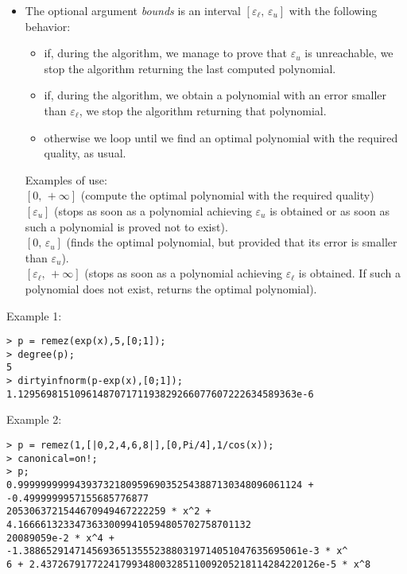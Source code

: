\begin{itemize}
\item The optional argument \emph{bounds} is an interval $[\varepsilon_\ell,\,\varepsilon_u]$
   with the following behavior:\begin{itemize}
     \item if, during the algorithm, we manage to prove that $\varepsilon_u$ is
       unreachable, we stop the algorithm returning the last computed
       polynomial.
     \item if, during the algorithm, we obtain a polynomial with an error smaller
       than $\varepsilon_\ell$, we stop the algorithm returning that polynomial.
     \item otherwise we loop until we find an optimal polynomial with the required
       quality, as usual.\end{itemize}
   Examples of use:\\
     $[0,\,+\infty]$ (compute the optimal polynomial with the required quality)\\
     $[\varepsilon_u]$ (stops as soon as a polynomial achieving $\varepsilon_u$ is
                   obtained or as soon as such a polynomial is proved not to
                   exist).\\
     $[0,\,\varepsilon_u]$ (finds the optimal polynomial, but provided that its error
                      is smaller than $\varepsilon_u$).\\
     $[\varepsilon_\ell,\,+\infty]$ (stops as soon as a polynomial achieving
                             $\varepsilon_\ell$ is obtained. If such a polynomial
                             does not exist, returns the optimal polynomial).
\end{itemize}
\noindent Example 1: 
\begin{center}\begin{minipage}{15cm}\begin{Verbatim}[frame=single]
> p = remez(exp(x),5,[0;1]);
> degree(p);
5
> dirtyinfnorm(p-exp(x),[0;1]);
1.1295698151096148707171193829266077607222634589363e-6
\end{Verbatim}
\end{minipage}\end{center}
\noindent Example 2: 
\begin{center}\begin{minipage}{15cm}\begin{Verbatim}[frame=single]
> p = remez(1,[|0,2,4,6,8|],[0,Pi/4],1/cos(x));
> canonical=on!;
> p;
0.99999999994393732180959690352543887130348096061124 + -0.4999999957155685776877
2053063721544670949467222259 * x^2 + 4.16666132334736330099410594805702758701132
20089059e-2 * x^4 + -1.3886529147145693651355523880319714051047635695061e-3 * x^
6 + 2.4372679177224179934800328511009205218114284220126e-5 * x^8
\end{Verbatim}
\end{minipage}\end{center}
